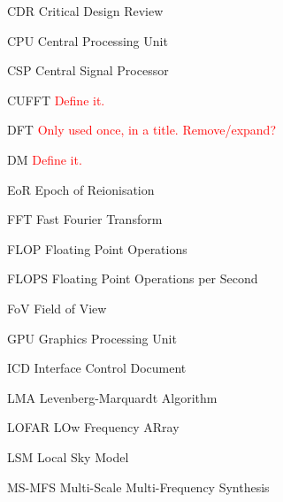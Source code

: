 \documentclass[11pt,a4paper]{article}
\begin{document}
\tccfrontpage

\sdptableofcontents

\sdplistofabbreviations
\begin{basedescript}{\desclabelstyle{\pushlabel}\desclabelwidth{6em}}
    \item[CDR] Critical Design Review \vspace{-0.2cm}
    \item[CPU] Central Processing Unit\vspace{-0.2cm}
    \item[CSP] Central Signal Processor\vspace{-0.2cm}
    \item[CUFFT] \textcolor{red}{Define it.}\vspace{-0.2cm}
    \item[DFT] \textcolor{red}{Only used once, in a title. Remove/expand?}\vspace{-0.2cm}
    \item[DM] \textcolor{red}{Define it.}\vspace{-0.2cm}
    \item[EoR] Epoch of Reionisation\vspace{-0.2cm}
    \item[FFT] Fast Fourier Transform\vspace{-0.2cm}
    \item[FLOP] Floating Point Operations \vspace{-0.2cm}
    \item[FLOPS] Floating Point Operations per Second \vspace{-0.2cm}
    \item[FoV] Field of View\vspace{-0.2cm}
    \item[GPU] Graphics Processing Unit \vspace{-0.2cm}
    \item[ICD] Interface Control Document\vspace{-0.2cm}
    \item[LMA] Levenberg-Marquardt Algorithm \vspace{-0.2cm}
    \item[LOFAR] LOw Frequency ARray\vspace{-0.2cm}
    \item[LSM] Local Sky Model\vspace{-0.2cm}
    \item[MS-MFS] Multi-Scale Multi-Frequency Synthesis\vspace{-0.2cm}

\end{basedescript}
\end{document}
